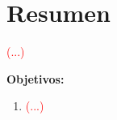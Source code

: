 \section*{Resumen}

\textcolor{red}{(...)}

\textbf{Objetivos:}
\begin{enumerate}
    \item \textcolor{red}{(...)}
\end{enumerate}

